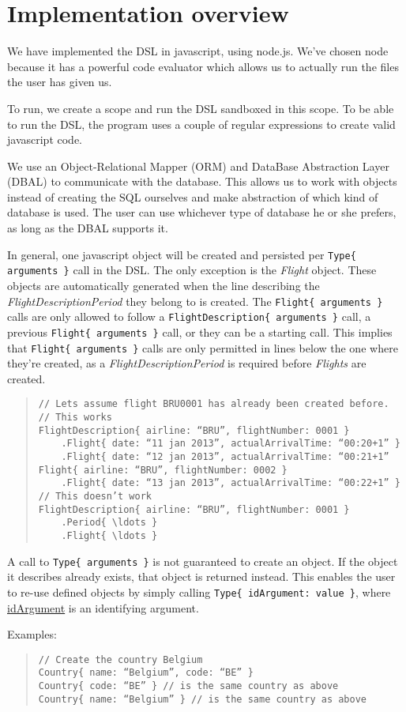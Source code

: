 \documentclass[a4paper,11pt]{article}
\newcommand{\spar}{\par \noindent}
\newcommand{\dslcode}[1]{\texttt{#1}}
\newcommand{\dsltype}[1]{\textit{#1}}
\newcommand{\dslattr}[1]{\uline{#1}}
\begin{document}
\section{Implementation overview}

We have implemented the DSL in javascript, using node.js.  We’ve chosen node because it has a powerful code evaluator which allows us to actually run the files the user has given us.
\par To run, we create a scope and run the DSL sandboxed in this scope. To be able to run the DSL, the program uses a couple of regular expressions to create valid javascript code.
\par We use an Object-Relational Mapper (ORM) and DataBase Abstraction Layer (DBAL) to communicate with the database. This allows us to work with objects instead of creating the SQL ourselves and make abstraction of which kind of database is used. The user can use whichever type of database he or she prefers, as long as the DBAL supports it.

In general, one javascript object will be created and persisted per \dslcode{Type\{ arguments \}} call in the DSL. The only exception is the \dsltype{Flight} object. These objects are automatically generated when the line describing the \dsltype{FlightDescriptionPeriod} they belong to is created.
The \dslcode{Flight\{ arguments \}} calls are only allowed to follow a \dslcode{FlightDescription\{ arguments \}} call, a previous \dslcode{Flight\{ arguments \}} call, or they can be a starting call.
This implies that \dslcode{Flight\{ arguments \}} calls are only permitted in lines below the one where they’re created, as a \dsltype{FlightDescriptionPeriod} is required before \dsltype{Flights} are created.

\begin{quote}\begin{verbatim}
// Lets assume flight BRU0001 has already been created before.
// This works
FlightDescription{ airline: “BRU”, flightNumber: 0001 }
    .Flight{ date: “11 jan 2013”, actualArrivalTime: “00:20+1” }
    .Flight{ date: “12 jan 2013”, actualArrivalTime: “00:21+1”
Flight{ airline: “BRU”, flightNumber: 0002 }
    .Flight{ date: “13 jan 2013”, actualArrivalTime: “00:22+1” }
// This doesn’t work
FlightDescription{ airline: “BRU”, flightNumber: 0001 }
    .Period{ \ldots }
    .Flight{ \ldots }
\end{verbatim}\end{quote}

A call to \dslcode{Type\{ arguments \}} is not guaranteed to create an object. If the object it describes already exists, that object is returned instead. This enables the user to re-use defined objects by simply calling \dslcode{Type\{ idArgument: value \}}, where \dslattr{idArgument} is an identifying argument.
\spar Examples:
\begin{quote}\begin{verbatim}
// Create the country Belgium
Country{ name: “Belgium”, code: “BE” }
Country{ code: “BE” } // is the same country as above
Country{ name: “Belgium” } // is the same country as above
\end{verbatim}\end{quote}
\end{document}
